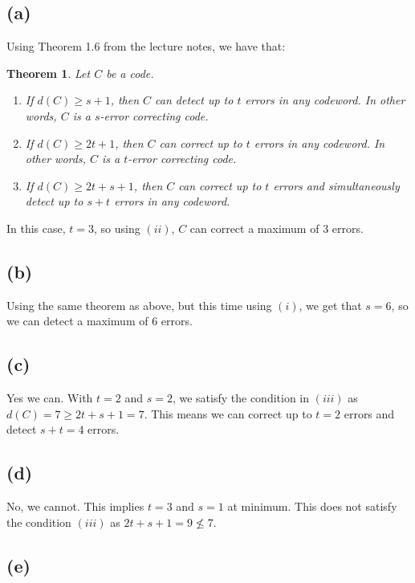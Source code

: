 \documentclass[a4paper, fleqn]{article}
\newtheorem{theorem}{Theorem}
\begin{document}
\subsection{(a)}
Using Theorem 1.6 from the lecture notes, we have that:
\begin{theorem}
  Let $C$ be a code.
  \begin{enumerate}[i]
    \item If $d(C)\geq s+1$, then $C$ can detect up to $t$ errors in any codeword. In
      other words, $C$ is a $s$-error correcting code.
    \item If $d(C)\geq 2t+1$, then $C$ can correct up to $t$ errors in any codeword. In
      other words, $C$ is a $t$-error correcting code.
    \item If $d(C)\geq 2t+s+1$, then $C$ can correct up to $t$ errors and simultaneously
      detect up to $s+t$ errors in any codeword.
  \end{enumerate}
\end{theorem}
In this case, $t=3$, so using $(ii)$, $C$ can correct a maximum of $3$ errors.

\subsection{(b)}
Using the same theorem as above, but this time using $(i)$, we get that $s=6$, so we can
detect a maximum of $6$ errors.

\subsection{(c)}
Yes we can. With $t=2$ and $s=2$, we satisfy the condition in $(iii)$ as $d(C)=7\geq
2t+s+1=7$. This means we can correct up to $t=2$ errors and detect $s+t=4$ errors.

\subsection{(d)}
No, we cannot. This implies $t=3$ and $s=1$ at minimum. This does not satisfy the
condition $(iii)$ as $2t+s+1=9\not \leq 7$.

\subsection{(e)}
\end{document}
